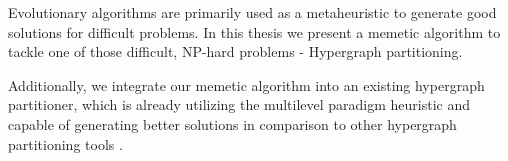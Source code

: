 \documentclass[a4paper,12pt,titlepage, BCOR7mm,headsepline]{scrbook}
\numberwithin{equation}{section}
\begin{document}
Evolutionary algorithms are primarily used as a metaheuristic to generate good solutions for difficult problems. In this thesis we present a memetic algorithm to tackle one of those difficult, NP-hard problems \cite{garey2002computers} - Hypergraph partitioning. 

Additionally, we integrate our memetic algorithm into an existing hypergraph partitioner, which is already utilizing the multilevel paradigm \cite{bulucc2016recent} heuristic and capable of generating better solutions in comparison to other hypergraph partitioning tools \cite{schlag2016k}. 

%
%
%
%
%
%
\end{document}
